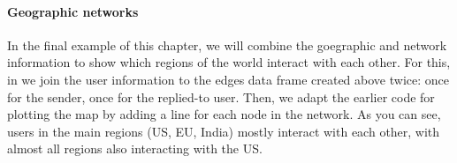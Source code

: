 \paragraph{Geographic networks}
In the final example of this chapter, we will combine the goegraphic and network information to
show which regions of the world interact with each other.
For this, in  we join the user information to the edges data frame created above twice:
once for the sender, once for the replied-to user.
Then, we adapt the earlier code for plotting the map by adding a line for each node in the network.
As you can see, users in the main regions (US, EU, India) mostly interact with each other,
with almost all regions also interacting with the US.

